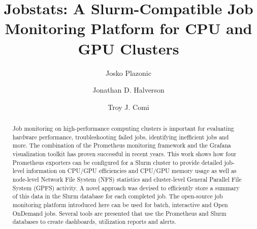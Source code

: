 \documentclass[manuscript]{acmart}
\begin{document}
\title[Jobstats: A Platform for Job Monitoring]{Jobstats: A Slurm-Compatible Job Monitoring Platform for CPU and GPU Clusters}


\author{Josko Plazonic}

\author{Jonathan D. Halverson}

\author{Troy J. Comi}

\renewcommand{\shortauthors}{Plazonic, Halverson and Comi}

\begin{abstract}
Job monitoring on high-performance computing clusters is important for evaluating hardware performance, troubleshooting failed jobs, identifying inefficient jobs and more. The combination of the Prometheus monitoring framework and the Grafana visualization toolkit has proven successful in recent years. This work shows how four Prometheus exporters can be configured for a Slurm cluster to provide detailed job-level information on CPU/GPU efficiencies and CPU/GPU memory usage as well as node-level Network File System (NFS) statistics and cluster-level General Parallel File System (GPFS) activity. A novel approach was devised to efficiently store a summary of this data in the Slurm database for each completed job. The open-source job monitoring platform introduced here can be used for batch, interactive and Open OnDemand jobs. Several tools are presented that use the Prometheus and Slurm databases to create dashboards, utilization reports and alerts.
\end{abstract}
\end{document}
